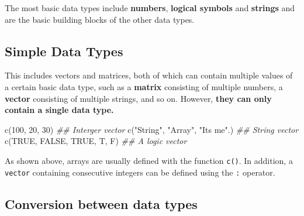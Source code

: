 \documentclass[
]{article}
\newenvironment{Shaded}{}{}
\newcommand{\ConstantTok}[1]{\textcolor[rgb]{0.53,0.00,0.00}{#1}}
\newcommand{\DecValTok}[1]{\textcolor[rgb]{0.25,0.63,0.44}{#1}}
\newcommand{\DocumentationTok}[1]{\textcolor[rgb]{0.73,0.13,0.13}{\textit{#1}}}
\newcommand{\FunctionTok}[1]{\textcolor[rgb]{0.02,0.16,0.49}{#1}}
\newcommand{\NormalTok}[1]{#1}
\newcommand{\StringTok}[1]{\textcolor[rgb]{0.25,0.44,0.63}{#1}}
\begin{document}
The most basic data types include \textbf{numbers}, \textbf{logical
symbols} and \textbf{strings} and are the basic building blocks of the
other data types.

\hypertarget{simple-data-types}{%
\subsection{Simple Data Types}\label{simple-data-types}}

This includes vectors and matrices, both of which can contain multiple
values of a certain basic data type, such as a \textbf{matrix}
consisting of multiple numbers, a \textbf{vector} consisting of multiple
strings, and so on. However, \textbf{they can only contain a single data
type.}

\begin{Shaded}
\begin{Highlighting}[]
\FunctionTok{c}\NormalTok{(}\DecValTok{100}\NormalTok{, }\DecValTok{20}\NormalTok{, }\DecValTok{30}\NormalTok{) }\DocumentationTok{\#\# Interger vector }
\FunctionTok{c}\NormalTok{(}\StringTok{"String"}\NormalTok{, }\StringTok{"Array"}\NormalTok{, }\StringTok{"It\textquotesingle{}s me"}\NormalTok{.) }\DocumentationTok{\#\# String vector}
\FunctionTok{c}\NormalTok{(}\ConstantTok{TRUE}\NormalTok{, }\ConstantTok{FALSE}\NormalTok{, }\ConstantTok{TRUE}\NormalTok{, T, F) }\DocumentationTok{\#\# A logic vector}
\end{Highlighting}
\end{Shaded}

As shown above, arrays are usually defined with the function
\texttt{c()}. In addition, a \texttt{vector} containing consecutive
integers can be defined using the \texttt{:} operator.

\hypertarget{conversion-between-data-types}{%
\subsection{Conversion between data
types}\label{conversion-between-data-types}}
\end{document}
